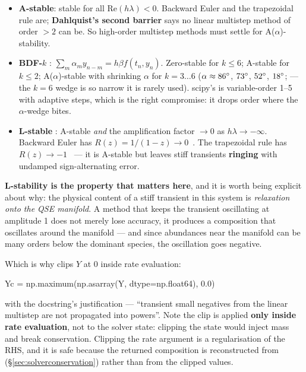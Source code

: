 \begin{itemize}
\item \textbf{A-stable}: stable for all $\mathrm{Re}(h\lambda) < 0$. Backward
  Euler and the trapezoidal rule are; \textbf{Dahlquist's second barrier}
  \citep{dahlquist1963} says no linear multistep method of order $> 2$ can be.
  So high-order multistep methods must settle for A($\alpha$)-stability.
\item \textbf{BDF-$k$} \citep{curtiss1952, gear1971}:
  $\sum_{m} \alpha_m y_{n-m} = h \beta f(t_n, y_n)$. Zero-stable for $k \le 6$;
  A-stable for $k \le 2$; A($\alpha$)-stable with shrinking $\alpha$ for
  $k = 3\ldots6$ ($\alpha \approx 86^{\circ}$, $73^{\circ}$, $52^{\circ}$,
  $18^{\circ}$; \citealp{hairer1996} --- the $k = 6$ wedge is so narrow it is
  rarely used). scipy's  is variable-order 1--5 with adaptive steps,
  which is the right compromise: it drops order where the $\alpha$-wedge bites.
\item \textbf{L-stable} \citep{ehle1969}: A-stable \emph{and} the amplification
  factor $\to 0$ as $h\lambda \to -\infty$. Backward Euler has
  $R(z) = 1/(1-z) \to 0$~\yes. The trapezoidal rule has $R(z) \to -1$~\no{} ---
  it is A-stable but leaves stiff transients \textbf{ringing} with undamped
  sign-alternating error.
\end{itemize}

\begin{invariant}
\textbf{L-stability is the property that matters here}, and it is worth being
explicit about why: the physical content of a stiff transient in this system is
\emph{relaxation onto the QSE manifold}. A method that keeps the transient
oscillating at amplitude 1 does not merely lose accuracy, it produces a
composition that oscillates around the manifold --- and since abundances near
the manifold can be many orders below the dominant species, the oscillation goes
negative.
\end{invariant}

Which is why  clips $Y$ at 0 inside rate evaluation:

\begin{srclisting}
Yc = np.maximum(np.asarray(Y, dtype=np.float64), 0.0)
\end{srclisting}

with the docstring's justification --- ``transient small negatives from the
linear multistep are not propagated into powers''. Note the clip is applied
\textbf{only inside rate evaluation}, not to the solver state: clipping the
state would inject mass and break conservation. Clipping the rate argument is a
regularisation of the RHS, and it is safe because the returned composition is
reconstructed from \Phifl{} (\S\ref{sec:solverconservation}) rather than from
the clipped values.

